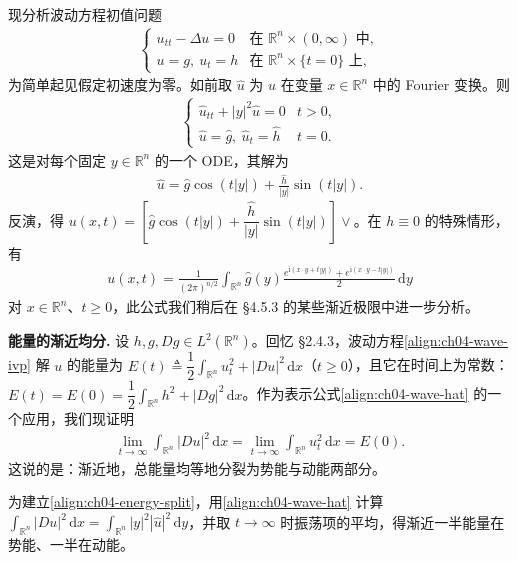 \documentclass[../../main.tex]{subfiles}
\begin{document}
\begin{example}[波动方程]\label{example:ch04-wave-fourier}现分析波动方程初值问题
\begin{align}\label{align:ch04-wave-ivp}
\begin{cases}
u_{tt}-\Delta u=0 & \text{在 }\mathbb{R}^n\times(0,\infty)\text{ 中},\\
u=g,\ u_t=h & \text{在 }\mathbb{R}^n\times\{t=0\}\text{ 上},
\end{cases}
\end{align}
为简单起见假定初速度为零。如前取 $\widehat{u}$ 为 $u$ 在变量 $x\in\mathbb{R}^n$ 中的 Fourier 变换。则
\begin{align*}
\begin{cases}
\widehat{u}_{tt}+|y|^2\widehat{u}=0 & t>0,\\
\widehat{u}=\widehat{g},\ \widehat{u}_t=\widehat{h} & t=0.
\end{cases}
\end{align*}
这是对每个固定 $y\in\mathbb{R}^n$ 的一个 ODE，其解为
\begin{align}\label{align:ch04-wave-hat}
\widehat{u}=\widehat{g}\cos(t|y|)+\frac{\widehat{h}}{|y|}\sin(t|y|).
\end{align}
反演，得 $u(x,t)=\left[\widehat{g}\cos(t|y|)+\dfrac{\widehat{h}}{|y|}\sin(t|y|)\right]\vee$。在 $h\equiv 0$ 的特殊情形，有
\begin{align}\label{align:ch04-wave-special}
u(x,t)=\frac{1}{(2\pi)^{n/2}}\int_{\mathbb{R}^n}\widehat{g}(y)\frac{e^{\mathrm{i}(x\cdot y+t|y|)}+e^{\mathrm{i}(x\cdot y-t|y|)}}{2}\,\mathrm{d}y
\end{align}
对 $x\in\mathbb{R}^n$、$t\geqslant 0$，此公式我们稍后在 \S4.5.3 的某些渐近极限中进一步分析。
\end{example}

\textbf{能量的渐近均分.} 设 $h,g,Dg\in L^2(\mathbb{R}^n)$。回忆 \S2.4.3，波动方程\eqref{align:ch04-wave-ivp} 解 $u$ 的能量为 $E(t)\triangleq\dfrac{1}{2}\int_{\mathbb{R}^n}u_t^2+|Du|^2\,\mathrm{d}x$（$t\geqslant 0$），且它在时间上为常数：$E(t)=E(0)=\dfrac{1}{2}\int_{\mathbb{R}^n}h^2+|Dg|^2\,\mathrm{d}x$。作为表示公式\eqref{align:ch04-wave-hat} 的一个应用，我们现证明
\begin{align}\label{align:ch04-energy-split}
\lim_{t\to\infty}\int_{\mathbb{R}^n}|Du|^2\,\mathrm{d}x=\lim_{t\to\infty}\int_{\mathbb{R}^n}u_t^2\,\mathrm{d}x=E(0).
\end{align}
这说的是：渐近地，总能量均等地分裂为势能与动能两部分。

为建立\eqref{align:ch04-energy-split}，用\eqref{align:ch04-wave-hat} 计算 $\int_{\mathbb{R}^n}|Du|^2\,\mathrm{d}x=\int_{\mathbb{R}^n}|y|^2|\widehat{u}|^2\,\mathrm{d}y$，并取 $t\to\infty$ 时振荡项的平均，得渐近一半能量在势能、一半在动能。
\end{document}

